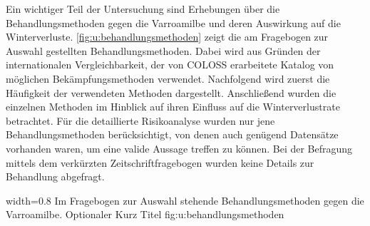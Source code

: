 Ein wichtiger Teil der Untersuchung sind Erhebungen über die Behandlungsmethoden gegen die Varroamilbe und deren Auswirkung auf die Winterverluste. \cref{fig:u:behandlungsmethoden} zeigt die am Fragebogen zur Auswahl gestellten Behandlungsmethoden. Dabei wird aus Gründen der internationalen Vergleichbarkeit, der von COLOSS erarbeitete Katalog von möglichen Bekämpfungsmethoden verwendet. Nachfolgend wird zuerst die Häufigkeit der verwendeten Methoden dargestellt. Anschließend wurden die einzelnen Methoden im Hinblick auf ihren Einfluss auf die Winterverlustrate betrachtet. Für die detaillierte Risikoanalyse wurden nur jene Behandlungsmethoden berücksichtigt, von denen auch genügend Datensätze vorhanden waren, um eine valide Aussage treffen zu können. Bei der Befragung mittels dem verkürzten Zeitschriftfragebogen wurden keine Details zur Behandlung abgefragt.

{width=0.8\textwidth} %
{Im Fragebogen zur Auswahl stehende Behandlungsmethoden gegen die Varroamilbe.} %
{Optionaler Kurz Titel} %
{fig:u:behandlungsmethoden} %

